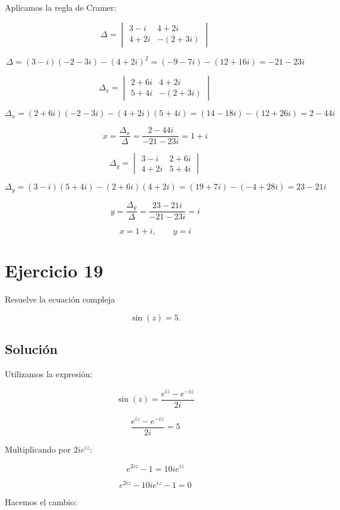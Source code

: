 \documentclass[fleqn]{article}
\begin{document}
		Aplicamos la regla de Cramer:

		\[
		\Delta
		=
		\begin{vmatrix}
		3-i & 4+2i\\
		4+2i & -(2+3i)
		\end{vmatrix}
		\]

		\[
		\Delta
		=
		(3-i)(-2-3i)-(4+2i)^2
		=
		(-9-7i)-(12+16i)
		=
		-21-23i
		\]

		\[
		\Delta_x
		=
		\begin{vmatrix}
		2+6i & 4+2i\\
		5+4i & -(2+3i)
		\end{vmatrix}
		\]

		\[
		\Delta_x
		=
		(2+6i)(-2-3i)-(4+2i)(5+4i)
		=
		(14-18i)-(12+26i)
		=
		2-44i
		\]

		\[
		x
		=
		\frac{\Delta_x}{\Delta}
		=
		\frac{2-44i}{-21-23i}
		=
		1+i
		\]

		\[
		\Delta_y
		=
		\begin{vmatrix}
		3-i & 2+6i\\
		4+2i & 5+4i
		\end{vmatrix}
		\]

		\[
		\Delta_y
		=
		(3-i)(5+4i)-(2+6i)(4+2i)
		=
		(19+7i)-(-4+28i)
		=
		23-21i
		\]

		\[
		y
		=
		\frac{\Delta_y}{\Delta}
		=
		\frac{23-21i}{-21-23i}
		=
		i
		\]

		\[
		\boxed{
		x=1+i,
		\qquad
		y=i
		}
		\]
	
	\section{Ejercicio 19}
		Resuelve la ecuación compleja

		\[
		\sin(z)=5.
		\]

		\subsection{Solución}

		Utilizamos la expresión:

		\[
		\sin(z)=\frac{e^{iz}-e^{-iz}}{2i}
		\]

		\[
		\frac{e^{iz}-e^{-iz}}{2i}=5
		\]

		Multiplicando por $2ie^{iz}$:

		\[
		e^{2iz}-1=10ie^{iz}
		\]

		\[
		e^{2iz}-10ie^{iz}-1=0
		\]

		Hacemos el cambio:
\end{document}
